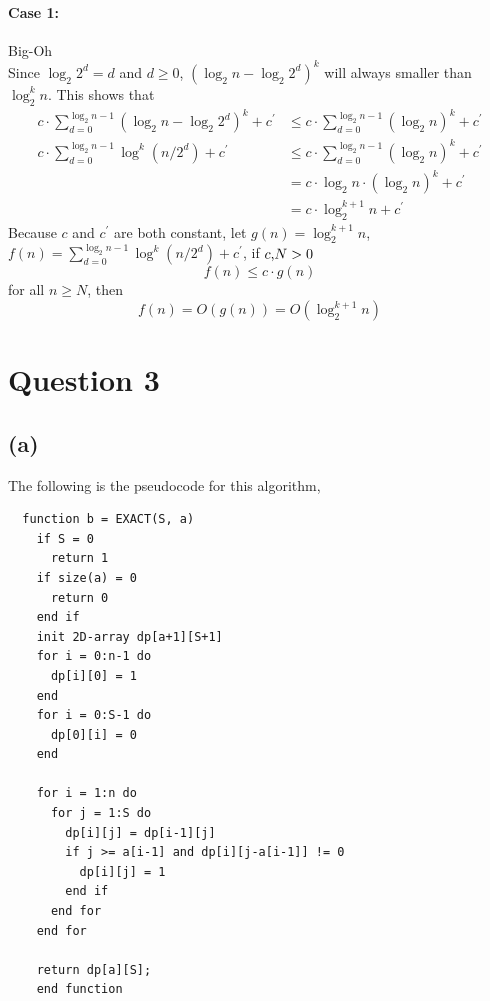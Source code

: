 \documentclass{article}
\begin{document}
\paragraph{Case 1:} Big-Oh \\
Since $\log_2 2^d = d$ and $d \geq 0$, $(\log_2 n - \log_2 2^d)^k$ will always smaller than $\log^k_2 n$.
This shows that 
\begin{align}
    c \cdot \sum^{\log_2 n -1}_{d=0}(\log_2 n - \log_2 2^d)^k + c^\prime &\leq c \cdot \sum^{\log_2 n -1}_{d=0}(\log_2 n)^k + c^\prime \\ \nonumber
    c \cdot \sum^{\log_2 n -1}_{d=0}\log^k (n/2^d) + c^\prime &\leq c \cdot \sum^{\log_2 n -1}_{d=0}(\log_2 n)^k + c^\prime \\ \nonumber
    &= c \cdot \log_2 n \cdot (\log_2 n)^k + c^\prime \\ \nonumber
    &= c \cdot \log^{k+1}_2 n + c^\prime \nonumber
\end{align}
Because $c$ and $c^\prime$ are both constant, let $g(n) =\log^{k+1}_2 n $, $f(n) =\sum^{\log_2 n -1}_{d=0}\log^k (n/2^d) + c^\prime$, if $c \textmd{,} N> 0$
$$f(n) \leq c \cdot g(n)$$
for all $n \geq N$, then 
$$f(n) = O(g(n)) = O(\log^{k+1}_2 n)$$










\section*{Question 3}
\subsection*{(a)}
The following is the pseudocode for this algorithm,
\begin{multicols}{2}
\begin{verbatim}
  function b = EXACT(S, a)
    if S = 0 
      return 1
    if size(a) = 0
      return 0
    end if
    init 2D-array dp[a+1][S+1]
    for i = 0:n-1 do
      dp[i][0] = 1
    end
    for i = 0:S-1 do
      dp[0][i] = 0
    end

    for i = 1:n do
      for j = 1:S do
        dp[i][j] = dp[i-1][j]
        if j >= a[i-1] and dp[i][j-a[i-1]] != 0
          dp[i][j] = 1
        end if
      end for
    end for

    return dp[a][S];
    end function
\end{verbatim}
\end{multicols}
\end{document}
